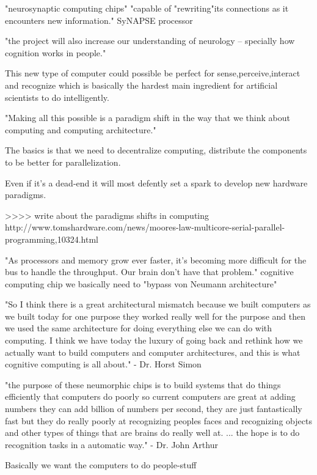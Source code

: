 \documentclass{article}
\begin{document}
"neurosynaptic computing chips" 
"capable of "rewriting"its connections as it
encounters new information."
SyNAPSE processor

"the project will also increase our understanding of neurology -- specially how
cognition works in people."

This new type of computer could possible be perfect for sense,perceive,interact
and recognize which is basically the hardest main ingredient for artificial
scientists to do intelligently.

"Making all this possible is a paradigm shift in the way that we think about
computing and computing architecture."

The basics is that we need to decentralize computing, distribute the components
to be better for parallelization.

Even if it's a dead-end it will most defently set a spark to develop new
hardware paradigms.

>>>> write about the paradigms shifts in computing
http://www.tomshardware.com/news/moores-law-multicore-serial-parallel-programming,10324.html

"As processors and memory grow ever faster, it's becoming more difficult for
the bus to handle the throughput. Our brain don't have that problem."
cognitive computing chip
we basically need to "bypass von Neumann architecture"

    "So I think there is a great architectural mismatch because we built
    computers as we built today for one purpose they worked really well for the
    purpose and then we used the same architecture for doing everything else we
    can do with computing. I think we have today the luxury of going back and
    rethink how we actually want to build computers and computer architectures,
    and this is what cognitive computing is all about." - Dr. Horst Simon

    "the purpose of these neumorphic chips is to build systems that do things 
    efficiently that computers do poorly so current computers are great at
    adding numbers they can add billion of numbers per second, they are just
    fantastically fast but they do really poorly at recognizing peoples faces
    and recognizing objects and other types of things that are brains do really
    well at. ... the hope is to do recognition tasks in a automatic way." - Dr.
    John Arthur

    Basically we want the computers to do people-stuff
\end{document}
